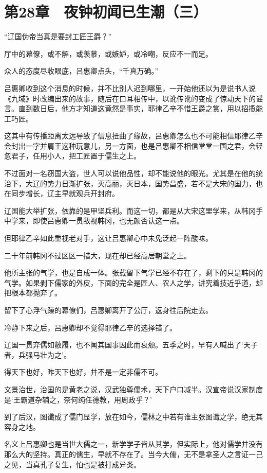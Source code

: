 \section{第28章　夜钟初闻已生潮（三）}

“辽国伪帝当真是要封工匠王爵？”

厅中的幕僚，或不解，或羡慕，或嫉妒，或冷嘲，反应不一而足。

众人的态度尽收眼底，吕惠卿点头，“千真万确。”

吕惠卿收到这个消息的时候，并不比别人迟到哪里，一开始他还以为是说书人说《九域》时改编出来的故事，随后在口耳相传中，以讹传讹的变成了惊动天下的谣言。直到数日后，他方才知道这竟然是事实，耶律乙辛不惜王爵之赏，用以招揽能工巧匠。

这其中有传播距离太远导致了信息扭曲了缘故，吕惠卿怎么也不可能相信耶律乙辛会封出一字并肩王这种玩意儿，另一方面，也是吕惠卿不相信堂堂一国之君，会轻忽君子，任用小人，把工匠置于儒生之上。

不过面对一名窃国大盗，世人可以说他品性，却不能说他的眼光。尤其是在他的统治下，大辽的势力日渐扩张，灭高丽，灭日本，国势昌盛，若不是大宋的国力，也在同步增长，辽主早就观兵开封府。

辽国能大举扩张，依靠的是甲坚兵利。而这一切，都是从大宋这里学来，从韩冈手中学来，即使吕惠卿一贯敌视韩冈，也无颜否认这一点。

但耶律乙辛如此重视老对手，这让吕惠卿心中未免泛起一阵酸味。

二十年前韩冈不过区区一措大，现在却已经高居朝堂之上。

他所主张的气学，也是自成一体。张载留下气学已经不存在了，剩下的只是韩冈的气学。如果剥下儒家的外皮，下面的完全是匠人、农人之学，讲究着技近乎道，却把根本都抛弃了。

留下了心浮气躁的幕僚们，吕惠卿离开了公厅，返身往后院走去。

冷静下来之后，吕惠卿却不觉得耶律乙辛的选择错了。

辽国一贯弃儒如敝履，也不闻其国事因此而衰颓。五季之时，早有人喊出了‘天子者，兵强马壮为之’。

得天下也好，昨天下也好，并不是一定非儒不可。

文景治世，治国的是黄老之说，汉武独尊儒术，天下户口减半。汉宣帝说汉家制度是‘王霸道杂辅之，奈何纯任德教，用周政乎？’

到了后汉，图谶成了儒门显学，放在如今，儒林之中若有谁主张图谶之学，绝无其容身之地。

名义上吕惠卿也是当世大儒之一，新学学子皆从其学，但实际上，他对儒学并没有那么大的坚持。真正的儒生，早就不存在了。当今大儒，无不是拿圣人之言证一己之见，当真孔子复生，怕也是被打成异类。

